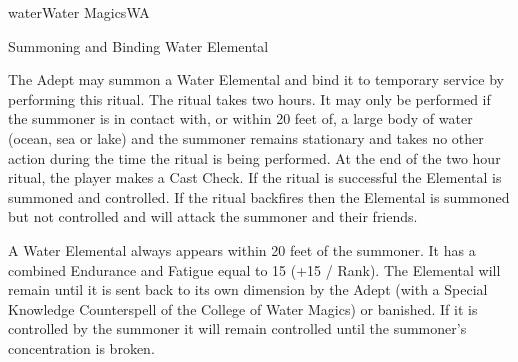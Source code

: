 \begin{College}[1.3]{water}{Water Magics}{WA}
\begin{ritual}[R-1]{Summoning and Binding Water Elemental}
\begin{effects}
The Adept may summon a Water Elemental and bind it to temporary
service by performing this ritual.  The ritual takes two hours.  It
may only be performed if the summoner is in contact with, or within 20
feet of, a large body of water (ocean, sea or lake) and the summoner
remains stationary and takes no other action during the time the
ritual is being performed. At the end of the two hour ritual, the
player makes a Cast Check.  If the ritual is successful the Elemental
is summoned and controlled.  If the ritual backfires then the
Elemental is summoned but not controlled and will attack the summoner
and their friends.

A Water Elemental always appears within 20 feet of the summoner. It
has a combined Endurance and Fatigue equal to 15 (+15 / Rank).  The
Elemental will remain until it is sent back to its own dimension by
the Adept (with a Special Knowledge Counterspell of the College of
Water Magics) or banished. If it is controlled by the summoner it will
remain controlled until the summoner’s concentration is broken.
\end{effects}
\end{ritual}

\end{College}

